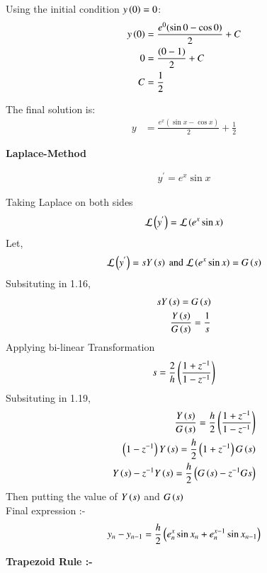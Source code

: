 \documentclass[journal]{IEEEtran}
\numberwithin{equation}{enumi}
\numberwithin{figure}{enumi}
\begin{document}
\begin{enumerate}
Using the initial condition $ y\left(0\right) = 0 $:
\begin{align}
y\left(0\right) &= \frac{e^0 (\sin{0} - \cos{0})}{2} + C \\
0 &= \frac{(0 - 1)}{2} + C \\
C &= \frac{1}{2}
\end{align}

The final solution is:
\begin{align}
y &= \frac{e^x (\sin{x} - \cos{x})}{2} + \frac{1}{2}
\end{align}

\textbf{Laplace-Method}

\begin{align}
y^{'} = e^x \sin{x}
\end{align}

Taking Laplace on both sides
\begin{align}
\mathcal{L}\left(y^{'}\right) = \mathcal{L}\left(e^x \sin{x}\right)
\end{align}
Let,
\begin{align}
\mathcal{L}\left(y^{'}\right) = sY\left(s\right) \text{ and } \mathcal{L}\left(e^x \sin{x}\right) = G\left(s\right)
\end{align}
Subsituting in 1.16,
\begin{align}
sY\left(s\right) = G\left(s\right)\\
\frac{Y\left(s\right)}{G\left(s\right)}=\frac{1}{s}
\end{align}
Applying bi-linear Transformation
\begin{align}
s = \frac{2}{h}\left(\frac{1+z^{-1}}{1-z^{-1}}\right)\\
\end{align}
Subsituting in 1.19,
\begin{align}
\frac{Y\left(s\right)}{G\left(s\right)}=\frac{h}{2}\left(\frac{1+z^{-1}}{1-z^{-1}}\right)\\
\left(1-z^{-1}\right)Y\left(s\right)=\frac{h}{2}\left(1+z^{-1}\right)G\left(s\right)\\
Y\left(s\right) - z^{-1}Y\left(s\right) = \frac{h}{2}\left(G\left(s\right)-z^{-1}G{s}\right)
\end{align}
Then putting the value of $Y\left(s\right)$ and $G\left(s\right)$\\
Final expression :-
\begin{align}
y_n - y_{n-1} = \frac{h}{2}\left(e^x_n \sin{x_n} + e^{x-1}_n \sin{x_{n-1}}\right)
\end{align}

\textbf{Trapezoid Rule :-}\\


\end{enumerate}
\end{document}
